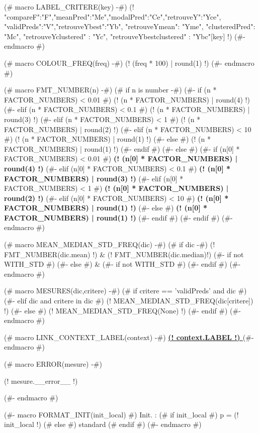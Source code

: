 (# macro LABEL_CRITERE(key) -#)
{\small (! {"compareF":"F","meanPred":"Me","modalPred":"Ce","retrouveY":"Yce",
"validPreds":"V","retrouveYbest":"Yb", "retrouveYmean": "Yme", "clusteredPred": "Mc",
"retrouveYclustered" : "Yc", "retrouveYbestclustered" : "Ybc"}[key] !)  }
(#- endmacro #)

(# macro COLOUR_FREQ(freq) -#)
\textcolor[rgb]{ (! (2 * (1.1 - freq))  | round(3) | truncate01 !) , (! (2 * freq - 1.3) | round(3) | truncate01 !) , 0.1}{(! (freq * 100) | round(1) !)}
(#- endmacro #)

(# macro FMT_NUMBER(n) -#)
(# if n is number -#)
(#- if (n  * FACTOR_NUMBERS) < 0.01 #)
(! (n  * FACTOR_NUMBERS) | round(4) !)
(#- elif (n  * FACTOR_NUMBERS) < 0.1 #)
(! (n  * FACTOR_NUMBERS) | round(3) !)
(#- elif (n  * FACTOR_NUMBERS) < 1 #)
(! (n  * FACTOR_NUMBERS) | round(2) !)
(#- elif (n  * FACTOR_NUMBERS) < 10 #)
(! (n  * FACTOR_NUMBERS) | round(1) !)
(#- else #)
(! (n  * FACTOR_NUMBERS) | round(1) !)
(#- endif #)
(#- else #)
(#- if (n[0] * FACTOR_NUMBERS) < 0.01 #)
\textbf{ (! (n[0] * FACTOR_NUMBERS) | round(4) !)}
(#- elif (n[0] * FACTOR_NUMBERS) < 0.1 #)
\textbf{ (! (n[0] * FACTOR_NUMBERS) | round(3) !)}
(#- elif (n[0] * FACTOR_NUMBERS) < 1 #)
\textbf{ (! (n[0] * FACTOR_NUMBERS) | round(2) !)}
(#- elif (n[0] * FACTOR_NUMBERS) < 10 #)
\textbf{ (! (n[0] * FACTOR_NUMBERS) | round(1) !)}
(#- else #)
\textbf{ (! (n[0] * FACTOR_NUMBERS) | round(1) !)}
(#- endif #)
(#- endif #)
(#- endmacro #)


(# macro MEAN_MEDIAN_STD_FREQ(dic) -#)
(# if dic -#)
(! FMT_NUMBER(dic.mean) !) & {\footnotesize (! FMT_NUMBER(dic.median)!) } (#- if not WITH_STD #) %
(#- else #)
& (#- if not WITH_STD #) %
(#- endif #)
(#- endmacro #)


(# macro MESURES(dic,critere) -#)
(# if critere == 'validPreds' and dic #)
(#- elif dic and critere in dic #)
    (!  MEAN_MEDIAN_STD_FREQ(dic[critere]) !)
(#- else #)
(! MEAN_MEDIAN_STD_FREQ(None) !)
(#- endif #)
(#- endmacro #)


(# macro LINK_CONTEXT_LABEL(context) -#)
\textbf{ \hyperref[contexts]{ (! context.LABEL !) }}
(#- endmacro #)

(# macro ERROR(mesure) -#)
\begin{minipage}{0.1\columnwidth}
    (! mesure.__error__ !)
\end{minipage}
(#- endmacro #)

(#- macro FORMAT_INIT(init_local) #)
Init. : (# if init_local #) p = (! init_local !) (# else #) standard (# endif #)
(#- endmacro #)